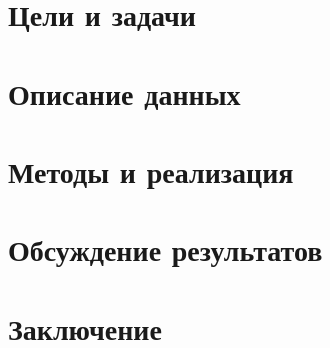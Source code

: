 \documentclass{spbau-diploma}
\begin{document}
\section{Цели и задачи}
\label{sec:goals}


\section{Описание данных}
\label{sec:data}


\section{Методы и реализация}
\label{sec:methods}

\label{sec:implementation}


\section{Обсуждение результатов}
\label{sec:experiments}


\section{Заключение}
\label{sec:conclusion}




\end{document}
